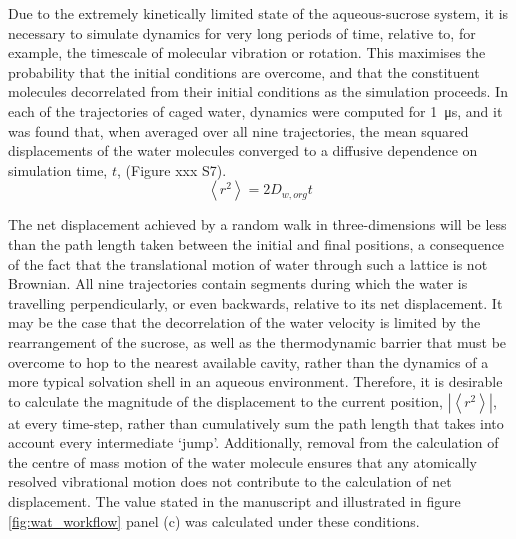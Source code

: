 Due to the extremely kinetically limited state of the aqueous-sucrose system, it is necessary to simulate dynamics for very long periods of time, relative to, for example, the timescale of molecular vibration or rotation. This maximises the probability that the initial conditions are overcome, and that the constituent molecules decorrelated from their initial conditions as the simulation proceeds. In each of the trajectories of caged water, dynamics were computed for \SI{1}{\micro\second}, and it was found that, when averaged over all nine trajectories, the mean squared displacements of the water molecules converged to a diffusive dependence on simulation time, $t$, (Figure xxx S7).
\begin{equation}\label{eqn:wat_msd}
\left\langle r^{2}\right\rangle=2 D_{w, org} t
\end{equation}

The net displacement achieved by a random walk in three-dimensions will be less than the path length taken between the initial and final positions, a consequence of the fact that the translational motion of water through such a lattice is not Brownian. All nine trajectories contain segments during which the water is travelling perpendicularly, or even backwards, relative to its net displacement. It may be the case that the decorrelation of the water velocity is limited by the rearrangement of the sucrose, as well as the thermodynamic barrier that must be overcome to hop to the nearest available cavity, rather than the dynamics of a more typical solvation shell in an aqueous environment. Therefore, it is desirable to calculate the magnitude of the displacement to the current position, $\left|\left\langle r^{2}\right\rangle\right|$, at every time-step, rather than cumulatively sum the path length that takes into account every intermediate `jump’. Additionally, removal from the calculation of the centre of mass motion of the water molecule ensures that any atomically resolved vibrational motion does not contribute to the calculation of net displacement. The value stated in the manuscript and illustrated in figure \ref{fig:wat_workflow} panel (c) was calculated under these conditions. 

